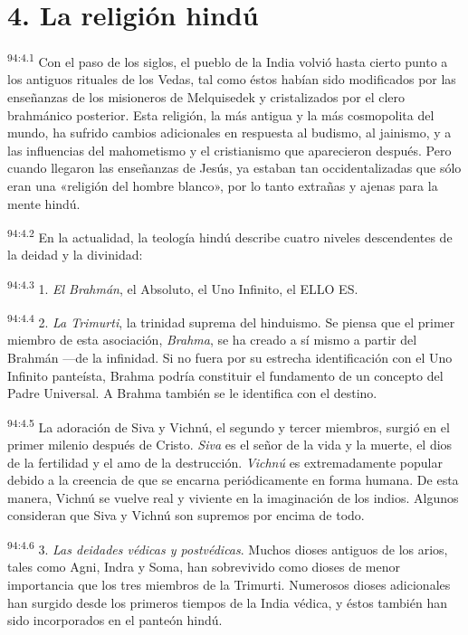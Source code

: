 \section*{4. La religión hindú}
\par
\textsuperscript{94:4.1} Con el paso de los siglos, el pueblo de la India volvió hasta cierto punto a los antiguos rituales de los Vedas, tal como éstos habían sido modificados por las enseñanzas de los misioneros de Melquisedek y cristalizados por el clero brahmánico posterior. Esta religión, la más antigua y la más cosmopolita del mundo, ha sufrido cambios adicionales en respuesta al budismo, al jainismo, y a las influencias del mahometismo y el cristianismo que aparecieron después. Pero cuando llegaron las enseñanzas de Jesús, ya estaban tan occidentalizadas que sólo eran una «religión del hombre blanco», por lo tanto extrañas y ajenas para la mente hindú.

\par
\textsuperscript{94:4.2} En la actualidad, la teología hindú describe cuatro niveles descendentes de la deidad y la divinidad:

\par
\textsuperscript{94:4.3} 1. \textit{El Brahmán}, el Absoluto, el Uno Infinito, el ELLO ES.

\par
\textsuperscript{94:4.4} 2. \textit{La Trimurti}, la trinidad suprema del hinduismo. Se piensa que el primer miembro de esta asociación, \textit{Brahma}, se ha creado a sí mismo a partir del Brahmán ---de la infinidad. Si no fuera por su estrecha identificación con el Uno Infinito panteísta, Brahma podría constituir el fundamento de un concepto del Padre Universal. A Brahma también se le identifica con el destino.

\par
\textsuperscript{94:4.5} La adoración de Siva y Vichnú, el segundo y tercer miembros, surgió en el primer milenio después de Cristo. \textit{Siva} es el señor de la vida y la muerte, el dios de la fertilidad y el amo de la destrucción. \textit{Vichnú} es extremadamente popular debido a la creencia de que se encarna periódicamente en forma humana. De esta manera, Vichnú se vuelve real y viviente en la imaginación de los indios. Algunos consideran que Siva y Vichnú son supremos por encima de todo.

\par
\textsuperscript{94:4.6} 3. \textit{Las deidades védicas y postvédicas}. Muchos dioses antiguos de los arios, tales como Agni, Indra y Soma, han sobrevivido como dioses de menor importancia que los tres miembros de la Trimurti. Numerosos dioses adicionales han surgido desde los primeros tiempos de la India védica, y éstos también han sido incorporados en el panteón hindú.


